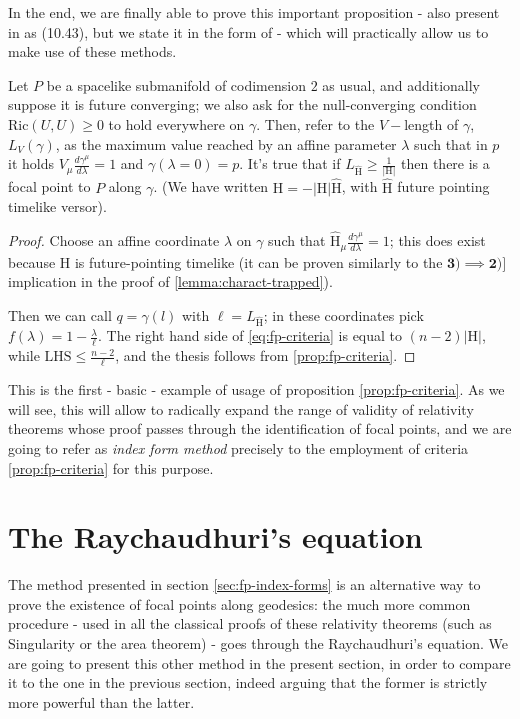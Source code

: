 	In the end, we are finally able to prove this important proposition - also present in \cite{o1983semi} as (10.43), but we state it in the form of \cite{fewster2020new}- which will practically allow us to make use of these methods.
	\begin{corollary}
		\label{cor:fp-criteria}
		Let \(P\) be a spacelike submanifold of codimension \(2\) as usual, and additionally suppose it is future converging; we also ask for the null-converging condition \(\text{Ric}(U, U) \ge 0\) to hold everywhere on \(\gamma\). Then, refer to the \(V-\)length of \(\gamma\), \(L_V(\gamma)\), as the maximum value reached by an affine parameter \(\lambda\) such that in \(p\) it holds \(V_{\mu}\frac{d\gamma^{\mu}}{d\lambda} = 1\) and \(\gamma(\lambda = 0) = p\). It's true that if \(L_{\hat{\mathrm{H}}} \ge \frac{1}{|\mathrm{H}|}\) then there is a focal point to \(P\) along \(\gamma\). (We have written \(\mathrm{H} = - |\mathrm{H}|\hat{\mathrm{H}}\), with \(\hat{\mathrm{H}}\) future pointing timelike versor).
	\end{corollary}

	\begin{proof}
		Choose an affine coordinate \(\lambda\) on \(\gamma\) such that \(\hat{\mathrm{H}}_{\mu}\frac{d\gamma^{\mu}}{d\lambda} = 1\); this does exist because \(\mathrm{H}\) is future-pointing timelike (it can be proven similarly to the \(\mathbf{3) \implies 2)]}\) implication in the proof of \ref{lemma:charact-trapped}).
		
		Then we can call \(q = \gamma(l)\) with \(\ell = L_{\hat{\mathrm{H}}}\); in these coordinates pick \(f(\lambda) = 1 - \frac{\lambda}{\ell}\). The right hand side of \eqref{eq:fp-criteria} is equal to \((n-2)|\mathrm{H}|\), while \(\text{LHS} \le \frac{n - 2}{\ell}\), and the thesis follows from \ref{prop:fp-criteria}.
	\end{proof}

	This is the first - basic - example of usage of proposition \ref{prop:fp-criteria}. As we will see, this will allow to radically expand the range of validity of relativity theorems whose proof passes through the identification of focal points, and we are going to refer as \emph{index form method} precisely to the employment of criteria \ref{prop:fp-criteria} for this purpose.
	
	\section{The Raychaudhuri's equation}
	The method presented in section \ref{sec:fp-index-forms} is an alternative way to prove the existence of focal points along geodesics: the much more common procedure - used in all the classical proofs of these relativity theorems (such as Singularity \cite{penrose1965gravitational} or the area theorem) - goes through the Raychaudhuri's equation. We are going to present this other method in the present section, in order to compare it to the one in the previous section, indeed arguing that the former is strictly more powerful than the latter.
	
